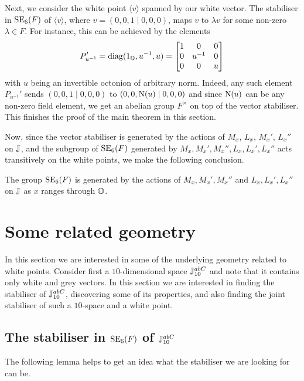 Next, we consider the white point $\langle v \rangle$ spanned by our white vector. The stabiliser
in $\mathrm{SE}_6(F)$ of $\langle v \rangle$, where $v = (0,0,1\mid 0,0,0)$, maps 
$v$ to $\lambda v$ for some non-zero 
$\lambda \in F$. For instance, this can be achieved by the elements 
\begin{equation}
	\label{eq:puprime}
	P_{u^{-1}}' = \mathrm{diag}(1_{\mathbb{O}},u^{-1},u) = \begin{bmatrix}
		1 & 0 & 0 \\
		0 & u^{-1} & 0 \\
		0 & 0 & u
	\end{bmatrix}	 
\end{equation}
with 
$u$ being an invertible octonion of arbitrary norm. 
Indeed, any such element $P_{u^{-1}}'$ sends
$(0,0,1\mid 0,0,0)$ to $(0,0,\mathord{\mathrm{N}}(u)\mid 0,0,0)$ and since $\mathord{\mathrm{N}}(u)$ can be any non-zero 
field element, we get an abelian group $F^{\times}$ on top of the vector stabiliser. This finishes
the proof of the main theorem in this section. 

Now, since the vector stabiliser is generated by the actions of $M_x$, $L_x$, $M_x'$,
$L_x''$ on $\mathbb{J}$, and the subgroup of $\mathrm{SE}_6(F)$ generated by 
$M_x,M_x',M_x'',L_x,L_x',L_x''$ acts transitively on the white points, 
we make the following conclusion. 

\begin{theorem}
The group $\mathrm{SE}_6(F)$ is generated by the actions
of $M_x,M_x',M_x''$ and $L_x,L_x',L_x''$ on $\mathbb{J}$ as $x$ ranges through $\mathbb{O}$. 
\end{theorem}

\section{Some related geometry}

In this section we are interested in some of the underlying geometry related to white 
points. Consider first a $10$-dimensional
space $\mathbb{J}_{10}^{abC}$ and note that it 
contains only white and grey vectors. In this section we are interested in finding the 
stabiliser of $\mathbb{J}_{10}^{abC}$, discovering some of its properties, and also finding
the joint stabiliser of such a $10$-space and a white point. 

\subsection{The stabiliser in $\mathrm{SE}_6(F)$ of $\mathbb{J}_{10}^{abC}$}

The following lemma helps to get an idea what the stabiliser
we are looking for can be. 

